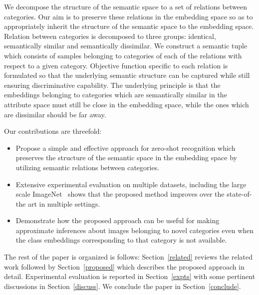 \documentclass[10pt,twocolumn,letterpaper]{article}
\begin{document}
We decompose the structure of the semantic space to a set of relations between categories. 
Our aim is to preserve these relations in the embedding space so as to appropriately inherit the structure of the semantic space to the embedding space. 
Relation between categories is decomposed to three groups: identical, semantically similar and semantically dissimilar.
We construct a semantic tuple which consists of samples belonging to categories of each of the relations with respect to a given category. 
Objective function specific to each relation is formulated so that the underlying semantic structure can be captured while still ensuring discriminative capability. 
The underlying principle is that the  embeddings belonging to categories which are semantically similar in the attribute space must still be close in the embedding space, while the ones which are dissimilar should be far away. 

Our contributions are threefold:
\begin{itemize}
	\itemsep0em
	\item Propose a simple and effective approach for zero-shot recognition which preserves the structure of the semantic space in the embedding space by utilizing semantic relations between categories.
	\item Extensive experimental evaluation on multiple datasets, including the large scale ImageNet~\cite{deng2009imagenet} shows that the proposed method improves over the state-of-the art in multiple settings.
	\item Demonstrate how the proposed approach can be useful for making approximate inferences about images belonging to novel categories even when the class embeddings corresponding to that category is not available. 
\end{itemize}
The rest of the paper is organized is follows: Section~\ref{related} reviews the related work followed by Section~\ref{proposed} which describes the proposed approach in detail. Experimental evaluation is reported in Section~\ref{expts} with some pertinent discussions in Section~\ref{discuss}. %
We conclude the paper in Section~\ref{conclude}.
\end{document}
